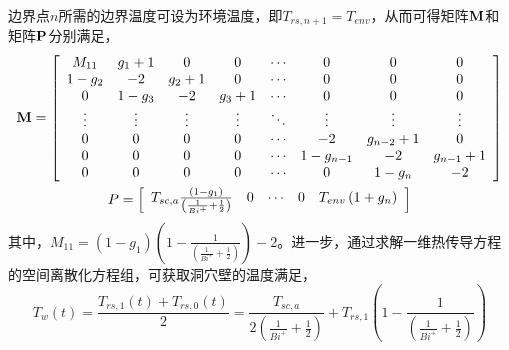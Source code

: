 边界点$n$所需的边界温度可设为环境温度，即${T_{rs,n + 1}} = {T_{env}}$，从而可得矩阵${\bf{M}}$和矩阵${\bf{P}}$分别满足\cite{Cavern-wall-09,Model-AA-CAES-10}，
\begin{subequations}
\begin{gather}
{\bf{M}} = \left[ {\begin{array}{*{20}{c}}
{{M_{11}}}&{{g_1} + 1}&0&0& \cdots &0&0&0\\
{1 - {g_2}}&{ - 2}&{{g_2} + 1}&0& \cdots &0&0&0\\
0&{1 - {g_3}}&{ - 2}&{{g_3} + 1}& \cdots &0&0&0\\
 \vdots & \vdots & \vdots & \vdots & \ddots & \vdots & \vdots & \vdots \\
0&0&0&0& \cdots &{ - 2}&{{g_{n - 2}} + 1}&0\\
0&0&0&0& \cdots &{1 - {g_{n - 1}}}&{ - 2}&{{g_{n - 1}} + 1}\\
0&0&0&0& \cdots &0&{1 - {g_n}}&{ - 2}
\end{array}} \right]\\
P = \left[ {\begin{array}{*{20}{c}}
{{T_{sc,a}}\frac{{\left( {1 - {g_1}} \right)}}{{\left( {\frac{1}{{B{i^ + }}} + \frac{1}{2}} \right)}}}&0& \cdots &0&{{T_{env}}\left( {1 + {g_n}} \right)}
\end{array}} \right]
\end{gather}
\end{subequations}
其中，${M_{11}} = \left( {1 - {g_1}} \right)\left( {1 - \frac{1}{{\left( {\frac{1}{{B{i^ + }}} + \frac{1}{2}} \right)}}} \right) - 2$。进一步，通过求解一维热传导方程的空间离散化方程组，可获取洞穴壁的温度满足，
\begin{equation}
{T_w}\left( t \right) = \frac{{{T_{rs,1}}\left( t \right) + {T_{rs,0}}\left( t \right)}}{2} = \frac{{{T_{sc,a}}}}{{2\left( {\frac{1}{{B{i^ + }}} + \frac{1}{2}} \right)}} + {T_{rs,1}}({1 - \frac{1}{{({\frac{1}{{B{i^ + }}} + \frac{1}{2}})}}})
\end{equation}
